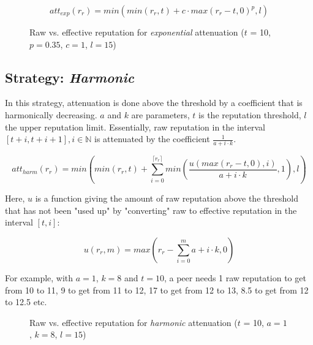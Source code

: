 \[att_{exp}(r_r) = min(min(r_r, t) + c \cdot max(r_r - t, 0)^p, l)\]

\begin{figure}[t]
\centering
{}
\caption{Raw vs. effective reputation for \emph{exponential} attenuation ($t$ =
10, $p = 0.35$, $c = 1$, $l = 15$)}
\label{fig:att_exp_raw_vs_eff}
\end{figure}

\subsection{Strategy: \emph{Harmonic}}
In this strategy, attenuation is done above the threshold by a coefficient that
is harmonically decreasing. $a$ and $k$ are parameters, $t$ is the reputation
threshold, $l$ the upper reputation limit.  Essentially, raw reputation in the
interval $[t + i, t + i + 1], i \in \mathbb{N}$ is attenuated by the coefficient
$\frac{1}{a + i \cdot k}$.

\[att_{harm}(r_r) = min(min(r_r, t) + \sum_{i=0}^{\lceil r_r
\rceil}{min(\frac{u(max(r_r - t, 0), i)}{a + i \cdot k}, 1)}, l)\]

Here, $u$ is a function giving the amount of raw reputation above the threshold
that has not been "used up" by "converting" raw to effective reputation in the
interval $[t, i]$:

\[u(r_r, m) = max(r_r - \sum_{i=0}^m{a + i \cdot k}, 0)\]

For example, with $a = 1$, $k = 8$ and $t = 10$, a peer needs 1 raw reputation
to get from 10 to 11, 9 to get from 11 to 12, 17 to get from 12 to 13, 8.5 to
get from 12 to 12.5 etc.

\begin{figure}[t]
\centering
{}
\caption{Raw vs. effective reputation for \emph{harmonic} attenuation ($t$ = 10,
$a = 1$, $k = 8$, $l = 15$)}
\label{fig:att_harm_raw_vs_eff}
\end{figure}

